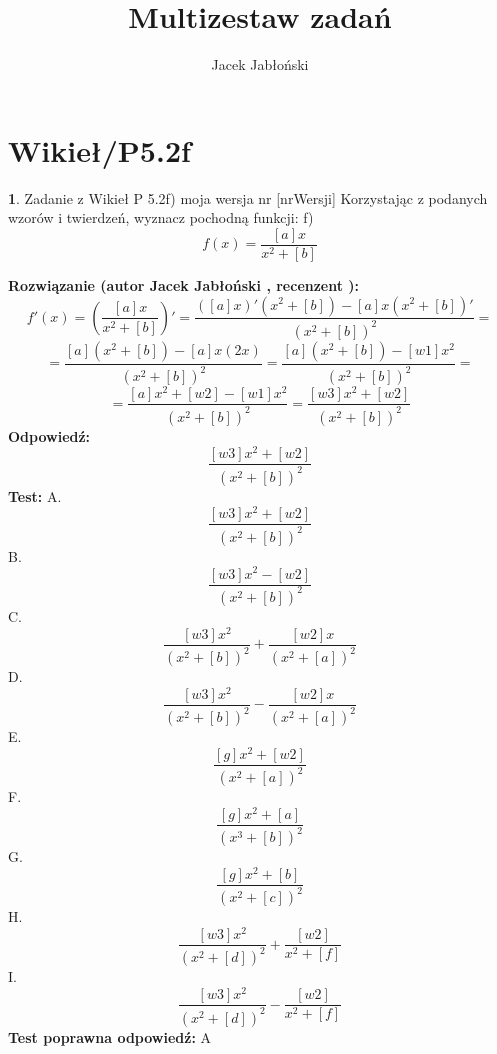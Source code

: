 \documentclass[12pt, a4paper]{article}
\title{Multizestaw zadań}
\author{Jacek Jabłoński}
\date{}
\theoremstyle{definition} %
\newtheorem{zad}{}
\newcommand{\kategoria}[1]{\section{#1}} %
\newcommand{\zadStart}[1]{\begin{zad}#1\newline} %
\newcommand{\zadStop}{\end{zad}}   %
\newcommand{\rozwStart}[2]{\noindent \textbf{Rozwiązanie (autor #1 , recenzent #2): }\newline} %
\newcommand{\rozwStop}{\newline}                                            %
\newcommand{\odpStart}{\noindent \textbf{Odpowiedź:}\newline}    %
\newcommand{\odpStop}{\newline}                                             %
\newcommand{\testStart}{\noindent \textbf{Test:}\newline} %
\newcommand{\testStop}{\newline} %
\newcommand{\kluczStart}{\noindent \textbf{Test poprawna odpowiedź:}\newline} %
\newcommand{\kluczStop}{\newline} %
\begin{document}
\maketitle


\kategoria{Wikieł/P5.2f}
\zadStart{Zadanie z Wikieł P 5.2f) moja wersja nr [nrWersji]}
Korzystając z podanych wzorów i twierdzeń, wyznacz pochodną funkcji:
f) $$f(x)=\frac{[a]x}{x^2+[b]}$$
\zadStop
\rozwStart{Jacek Jabłoński}{}
$$f'(x) = (\frac{[a]x}{x^2+[b]})' = \frac{([a]x)' (x^2+[b]) - [a]x (x^2+[b])'}{(x^2+[b])^2} =$$
$$= \frac{[a](x^2+[b]) - [a]x (2x)}{(x^2+[b])^2} = \frac{[a](x^2+[b]) - [w1]x^2}{(x^2+[b])^2} =$$
$$= \frac{[a]x^2 + [w2] - [w1]x^2}{(x^2+[b])^2} = \frac{[w3]x^2 + [w2]}{(x^2 + [b])^2}$$
\rozwStop
\odpStart
$$\frac{[w3]x^2 + [w2]}{(x^2 + [b])^2}$$
\odpStop
\testStart
A. $$\frac{[w3]x^2 + [w2]}{(x^2 + [b])^2}$$
B. $$\frac{[w3]x^2 - [w2]}{(x^2 + [b])^2}$$
C. $$\frac{[w3]x^2}{(x^2 + [b])^2} + \frac{[w2]x}{(x^2 + [a])^2}$$
D. $$\frac{[w3]x^2}{(x^2 + [b])^2} - \frac{[w2]x}{(x^2 + [a])^2}$$
E. $$\frac{[g]x^2 + [w2]}{(x^2 + [a])^2}$$
F. $$\frac{[g]x^2 + [a]}{(x^3 + [b])^2}$$
G. $$\frac{[g]x^2 + [b]}{(x^2 + [c])^2}$$
H. $$\frac{[w3]x^2}{(x^2 + [d])^2} + \frac{[w2]}{x^2 + [f]}$$
I. $$\frac{[w3]x^2}{(x^2 + [d])^2} - \frac{[w2]}{x^2 + [f]}$$
\testStop
\kluczStart
A
\kluczStop
\end{document}
